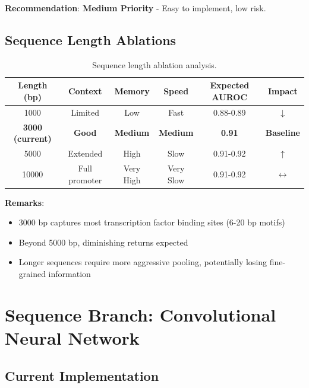 \documentclass[11pt,a4paper]{article}
\begin{document}
\textbf{Recommendation}: \textcolor{positive}{\textbf{Medium Priority}} - Easy to implement, low risk.

\subsection{Sequence Length Ablations}

\begin{table}[H]
\centering
\begin{tabular}{cccccc}
\toprule
\textbf{Length (bp)} & \textbf{Context} & \textbf{Memory} & \textbf{Speed} & \textbf{Expected AUROC} & \textbf{Impact} \\
\midrule
1000 & Limited & Low & Fast & 0.88-0.89 & \textcolor{negative}{$\downarrow$} \\
\rowcolor{lightgray}
\textbf{3000 (current)} & \textbf{Good} & \textbf{Medium} & \textbf{Medium} & \textbf{0.91} & \textbf{Baseline} \\
5000 & Extended & High & Slow & 0.91-0.92 & \textcolor{positive}{$\uparrow$} \\
10000 & Full promoter & Very High & Very Slow & 0.91-0.92 & \textcolor{neutral}{$\leftrightarrow$} \\
\bottomrule
\end{tabular}
\caption{Sequence length ablation analysis.}
\end{table}

\textbf{Remarks}:
\begin{itemize}
    \item 3000 bp captures most transcription factor binding sites (6-20 bp motifs)
    \item Beyond 5000 bp, diminishing returns expected
    \item Longer sequences require more aggressive pooling, potentially losing fine-grained information
\end{itemize}

\section{Sequence Branch: Convolutional Neural Network}

\subsection{Current Implementation}
\end{document}
